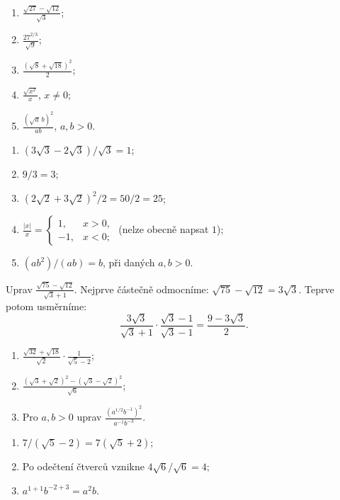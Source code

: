 \documentclass[11pt,a4paper]{article}
\begin{document}
\begin{zadaniReseniBox}[breakable=false,title={Samostatná práce 3}]
\begin{enumerate}[label=\alph*)]
\item $\displaystyle\frac{\sqrt{27}-\sqrt{12}}{\sqrt3}$;
\item $\displaystyle\frac{27^{2/3}}{\sqrt9}$;
\item $\displaystyle\frac{(\sqrt8+\sqrt{18})^2}{2}$;
\item $\displaystyle\frac{\sqrt{x^2}}x$, $x\ne0$;
\item $\displaystyle\frac{(\sqrt a\,b)^2}{ab}$, $a,b>0$.
\end{enumerate}
\tcblower
\begin{enumerate}[label=\alph*)]
\item $(3\sqrt3-2\sqrt3)/\sqrt3=\boxed1$;
\item $9/3=\boxed3$;
\item $(2\sqrt2+3\sqrt2)^2/2=50/2=\boxed{25}$;
\item $\displaystyle\frac{|x|}x=\begin{cases}1,&x>0,\\-1,&x<0;\end{cases}$
\quad(nelze obecně napsat $1$);
\item $(ab^2)/(ab)=\boxed b$, při daných $a,b>0$.
\end{enumerate}
\end{zadaniReseniBox}

\begin{prikladReseniBox}[breakable=false,title={Příklad 4}]
Uprav $\displaystyle
\frac{\sqrt{75}-\sqrt{12}}{\sqrt3+1}$.
\tcblower
Nejprve částečně odmocníme: $\sqrt{75}-\sqrt{12}=3\sqrt3$.
Teprve potom usměrníme:
\[
\frac{3\sqrt3}{\sqrt3+1}\cdot\frac{\sqrt3-1}{\sqrt3-1}
=\boxed{\frac{9-3\sqrt3}{2}}.
\]
\end{prikladReseniBox}

\begin{zadaniReseniBox}[breakable=false,title={Rozšíření 1}]
\begin{enumerate}[label=\alph*)]
\item $\displaystyle\frac{\sqrt{32}+\sqrt{18}}{\sqrt2}
\cdot\frac1{\sqrt5-2}$;
\item $\displaystyle\frac{(\sqrt3+\sqrt2)^2-(\sqrt3-\sqrt2)^2}{\sqrt6}$;
\item Pro $a,b>0$ uprav $\displaystyle\frac{(a^{1/2}b^{-1})^2}{a^{-1}b^{-3}}$.
\end{enumerate}
\tcblower
\begin{enumerate}[label=\alph*)]
\item $7/(\sqrt5-2)=\boxed{7(\sqrt5+2)}$;
\item Po odečtení čtverců vznikne $4\sqrt6/\sqrt6=\boxed4$;
\item $a^{1+1}b^{-2+3}=\boxed{a^2b}$.
\end{enumerate}
\end{zadaniReseniBox}
\end{document}
